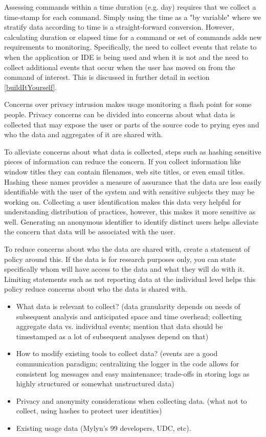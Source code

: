 Assessing commands within a time duration (e.g. day) requires that we collect a time-stamp for each command.  Simply using the time as a "by variable" where we stratify data according to time is a straight-forward conversion.  However, calculating duration or elapsed time for a command or set of commands adds new requirements to monitoring.  Specifically, the need to collect events that relate to when the application or IDE is being used and when it is not and the need to collect additional events that occur when the user has moved on from the command of interest.  This is discussed in further detail in section \ref{buildItYourself}.

Concerns over privacy intrusion makes usage monitoring a flash point for some people.  Privacy concerns can be divided into concerns about what data is collected that may expose the user or parts of the source code to prying eyes and who the data and aggregates of it are shared with.

To alleviate concerns about what data is collected, steps such as hashing sensitive pieces of information can reduce the concern. If you collect information like window titles they can contain filenames, web site titles, or even email titles.  Hashing these names provides a measure of assurance that the data are less easily identifiable with the user of the system and with sensitive subjects they may be working on.   Collecting a user identification makes this data very helpful for understanding distribution of practices, however, this makes it more sensitive as well.  Generating an anonymous identifier to identify distinct users helps alleviate the concern that data will be associated with the user.

To reduce concerns about who the data are shared with, create a statement of policy around this.  If the data is for research purposes only, you can state specifically whom will have access to the data and what they will do with it.  Limiting statements such as not reporting data at the individual level helps this policy reduce concerns about who the data is shared with.


    \begin{itemize}
\item
      What data is relevant to collect? (data granularity depends on needs of subsequent analysis and anticipated space and time overhead; collecting aggregate data vs. individual events; mention that data should be timestamped as a lot of subsequent analyses depend on that)
    \item
      How to modify existing tools to collect data? (events are a good communication paradigm; centralizing the logger in the code allows for consistent log messages and easy maintenance; trade-offs in storing logs as highly structured or somewhat unstructured data)
    \item
      Privacy and anonymity considerations when collecting data. (what not to collect, using hashes to protect user identities)


    \item
    	Existing usage data (Mylyn's 99 developers, UDC, etc). %

    \end{itemize}

